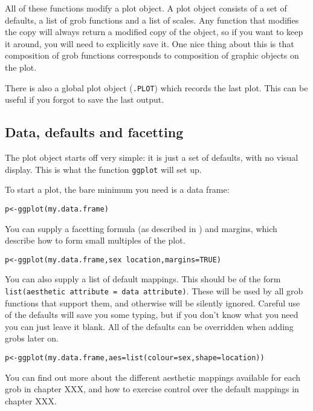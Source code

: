 All of these functions modify a plot object.  A plot object consists of a set of defaults, a list of grob functions and a list of scales.  Any function that modifies the copy will always return a modified copy of the object, so if you want to keep it around, you will need to explicitly save it.  One nice thing about this is that composition of grob functions corresponds to composition of graphic objects on the plot.

There is also a global plot object ({\tt .PLOT}) which records the last plot.  This can be useful if you forgot to save the last output.

\subsection{Data, defaults and facetting}\label{sub:data_defaults_and_facetting}

The plot object starts off very simple: it is just a set of defaults, with no visual display.  This is what the function {\tt ggplot} will set up.  

To start a plot, the bare minimum you need is a data frame:

\begin{alltt}
p <- ggplot(my.data.frame)
\end{alltt}

You can supply a facetting formula (as described in ) and margins, which describe how to form small multiples of the plot.

\begin{alltt}
p <- ggplot(my.data.frame, sex ~ location, margins=TRUE)
\end{alltt}

You can also supply a list of default mappings.  This should be of the form {\tt list(aesthetic attribute = data attribute)}.   These will be used by all grob functions that support them, and otherwise will be silently ignored.  Careful use of the defaults will save you some typing, but if you don't know what you need you can just leave it blank.  All of the defaults can be overridden when adding grobs later on.

\begin{alltt}
p <- ggplot(my.data.frame, aes=list(colour = sex, shape = location))  
\end{alltt}

You can find out more about the different aesthetic mappings available for each grob in chapter XXX, and how to exercise control over the default mappings in chapter XXX.

